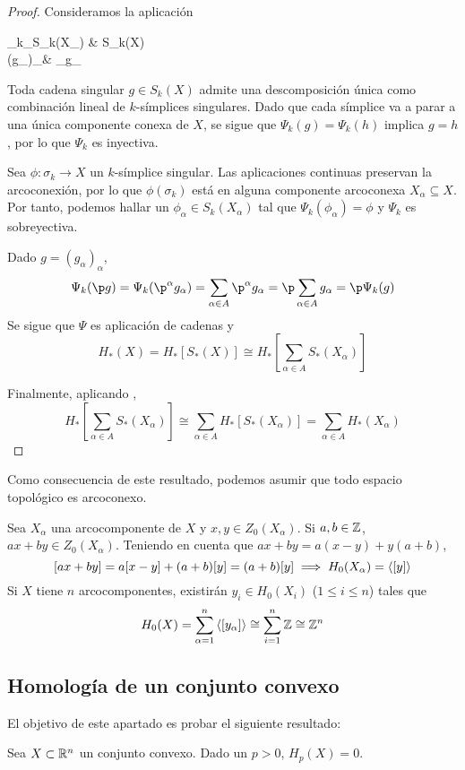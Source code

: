 \begin{proof}
	Consideramos la aplicación
	\begin{funcion*}
		\Psi_k\colon\sum_\alpha S_k(X_\alpha) \arrow[r] & S_k(X)          \\
		(g_\alpha)_\alpha \arrow[r, maps to]            & \sum_\alpha g_\alpha
	\end{funcion*}
	Toda cadena singular $g \in S_k(X)$ admite una descomposición única como combinación lineal de $k$-símplices singulares.
	Dado que cada símplice va a parar a una única componente conexa de $X$, se sigue que $\Psi_k(g)=\Psi_k(h)$ implica $g=h$, por lo que $\Psi_k$ es inyectiva.

	Sea $\phi\colon \sigma_k \to X$ un $k$-símplice singular.
	Las aplicaciones continuas preservan la arcoconexión, por lo que $\phi(\sigma_k)$ está en alguna componente arcoconexa $X_\alpha \subseteq X$.
	Por tanto, podemos hallar un $\phi_\alpha \in S_k(X_\alpha)$ tal que $\Psi_k(\phi_\alpha)=\phi$ y $\Psi_k$ es sobreyectiva.

	Dado $g=(g_\alpha)_\alpha$,
		\[\Psi_k(\p g)=\Psi_k({\p^\alpha g_\alpha})=\sum_{\alpha \in A}\p^\alpha g_\alpha=\p \sum_{\alpha \in A}g_\alpha=\p \Psi_k(g)\]
	Se sigue que $\Psi$ es aplicación de cadenas y
		\[H_*(X)=H_*[S_*(X)]\cong H_*\left[\sum_{\alpha \in A}S_*(X_\alpha)\right]\]

	Finalmente, aplicando ,
		\[H_*\left[\sum_{\alpha \in A}S_*(X_\alpha)\right]\cong\sum_{\alpha \in A}H_*[S_*(X_\alpha)]=\sum_{\alpha \in A}H_*\left(X_\alpha\right)\]
\end{proof}

Como consecuencia de este resultado, podemos asumir que todo espacio topológico es arcoconexo.

Sea $X_\alpha$ una arcocomponente de $X$ y $x,y \in Z_0(X_\alpha)$.
Si $a,b \in \mathbb{Z}$, $ax+by \in Z_0(X_\alpha)$.
Teniendo en cuenta que $ax+by=a(x-y)+y(a+b)$,
	\[[ax+by]=a[x-y]+(a+b)[y]=(a+b)[y] \implies H_0(X_\alpha)=\left\langle [y]\right\rangle\]
Si $X$ tiene $n$ arcocomponentes, existirán $y_i \in H_0(X_i)$ ($1 \leq i \leq n$) tales que
	\[H_0(X)=\sum^n_{\alpha=1}\left\langle [y_\alpha]\right\rangle\cong\sum^n_{i=1}\mathbb{Z} \cong \mathbb{Z}^n\]

\subsection{Homología de un conjunto convexo}
El objetivo de este apartado es probar el siguiente resultado:
\begin{theorem}
	Sea $X \subset \mathbb{R}^n$ un conjunto convexo. Dado un $p > 0$, $H_p(X)=0$.
\end{theorem}

